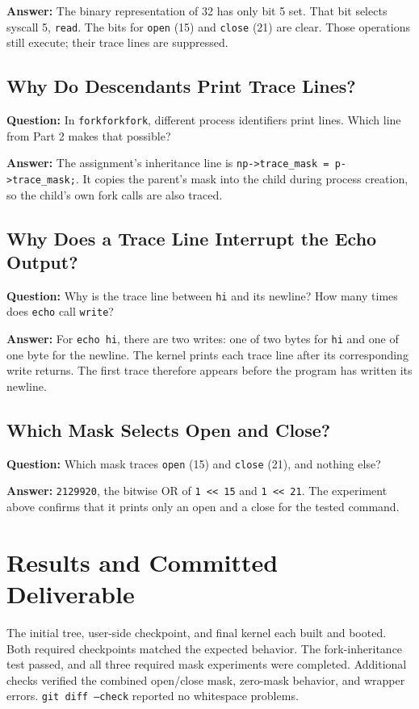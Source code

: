 \documentclass[12pt,a4paper]{article}
\begin{document}
\textbf{Answer:} The binary representation of 32 has only bit 5 set. That bit
selects syscall 5, \texttt{read}. The bits for \texttt{open} (15) and
\texttt{close} (21) are clear. Those operations still execute; their trace lines
are suppressed.

\subsection{Why Do Descendants Print Trace Lines?}
\textbf{Question:} In \texttt{forkforkfork}, different process identifiers print
lines. Which line from Part 2 makes that possible?

\textbf{Answer:} The assignment's inheritance line is
\texttt{np->trace\_mask = p->trace\_mask;}. It copies the parent's mask into the
child during process creation, so the child's own fork calls are also traced.

\subsection{Why Does a Trace Line Interrupt the Echo Output?}
\textbf{Question:} Why is the trace line between \texttt{hi} and its newline?
How many times does \texttt{echo} call \texttt{write}?

\textbf{Answer:} For \texttt{echo hi}, there are two writes: one of two bytes
for \texttt{hi} and one of one byte for the newline. The kernel prints each
trace line after its corresponding write returns. The first trace therefore
appears before the program has written its newline.

\subsection{Which Mask Selects Open and Close?}
\textbf{Question:} Which mask traces \texttt{open} (15) and \texttt{close} (21),
and nothing else?

\textbf{Answer:} \texttt{2129920}, the bitwise OR of \texttt{1 << 15} and
\texttt{1 << 21}. The experiment above confirms that it prints only an open
and a close for the tested command.

\section{Results and Committed Deliverable}
The initial tree, user-side checkpoint, and final kernel each built and booted.
Both required checkpoints matched the expected behavior. The fork-inheritance
test passed, and all three required mask experiments were completed. Additional
checks verified the combined open/close mask, zero-mask behavior, and wrapper
errors. \texttt{git diff --check} reported no whitespace problems.
\end{document}
